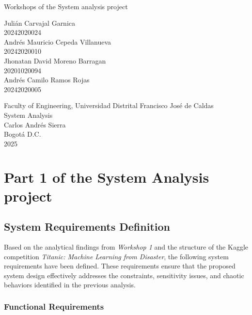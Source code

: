 \documentclass[12pt]{report}
\begin{document}
\begin{titlepage}

    \centering
    
    {\Large Workshops of the System analysis project \par}
    \vspace{3cm}
    
    {\large 
    Julián Carvajal Garnica \\ 
    20242020024 \\[0.5cm]
    Andrés Mauricio Cepeda Villanueva \\
    20242020010 \\[0.5cm]
    Jhonatan David Moreno Barragan \\
    20201020094\\[0.5cm]
    Andrés Camilo Ramos Rojas \\
    20242020005
    }
    
    \vfill
    
    Faculty of Engineering, Universidad Distrital Francisco José de Caldas \\
    System Analysis \\
    Carlos Andrés Sierra \\
    Bogotá D.C. \\
    2025
    
\end{titlepage}

\chapter*{Part 1 of the System Analysis project}

\section*{System Requirements Definition}

Based on the analytical findings from \textit{Workshop 1} and the structure of the Kaggle competition \textit{Titanic: Machine Learning from Disaster}, the following system requirements have been defined. These requirements ensure that the proposed system design effectively addresses the constraints, sensitivity issues, and chaotic behaviors identified in the previous analysis.

\subsection{Functional Requirements}
\end{document}
